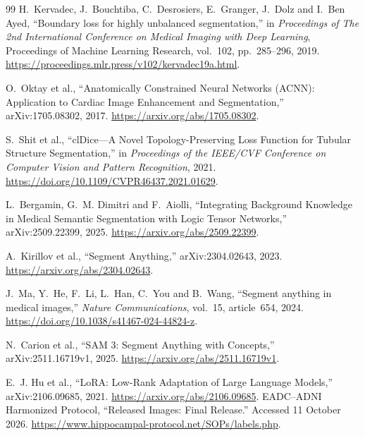 \documentclass[12pt,a4paper]{article}
\begin{document}
\begin{thebibliography}{99}
H.~Kervadec, J.~Bouchtiba, C.~Desrosiers, E.~Granger, J.~Dolz and
I.~Ben Ayed, ``Boundary loss for highly unbalanced segmentation,''
in \emph{Proceedings of The 2nd International Conference on Medical
Imaging with Deep Learning}, Proceedings of Machine Learning Research,
vol.~102, pp.~285--296, 2019.
\url{https://proceedings.mlr.press/v102/kervadec19a.html}.

O.~Oktay et al., ``Anatomically Constrained Neural Networks (ACNN):
Application to Cardiac Image Enhancement and Segmentation,''
arXiv:1705.08302, 2017. \url{https://arxiv.org/abs/1705.08302}.

S.~Shit et al., ``clDice---A Novel Topology-Preserving Loss Function
for Tubular Structure Segmentation,'' in \emph{Proceedings of the
IEEE/CVF Conference on Computer Vision and Pattern Recognition}, 2021.
\url{https://doi.org/10.1109/CVPR46437.2021.01629}.

L.~Bergamin, G.~M. Dimitri and F.~Aiolli, ``Integrating Background
Knowledge in Medical Semantic Segmentation with Logic Tensor Networks,''
arXiv:2509.22399, 2025. \url{https://arxiv.org/abs/2509.22399}.

A.~Kirillov et al., ``Segment Anything,'' arXiv:2304.02643, 2023.
\url{https://arxiv.org/abs/2304.02643}.

J.~Ma, Y.~He, F.~Li, L.~Han, C.~You and B.~Wang,
``Segment anything in medical images,'' \emph{Nature Communications},
vol.~15, article~654, 2024.
\url{https://doi.org/10.1038/s41467-024-44824-z}.

N.~Carion et al., ``SAM 3: Segment Anything with Concepts,''
arXiv:2511.16719v1, 2025. \url{https://arxiv.org/abs/2511.16719v1}.

E.~J. Hu et al., ``LoRA: Low-Rank Adaptation of Large Language Models,''
arXiv:2106.09685, 2021. \url{https://arxiv.org/abs/2106.09685}.
EADC--ADNI Harmonized Protocol, ``Released Images: Final Release.''
Accessed 11 October 2026.
\url{https://www.hippocampal-protocol.net/SOPs/labels.php}.

\end{thebibliography}

\clearpage
\appendix
\end{document}
